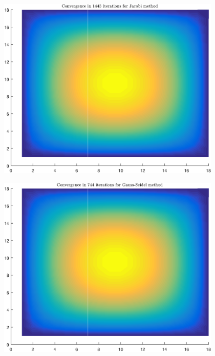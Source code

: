 \documentclass[11pt]{article}
\begin{document}
\begin{figure}
\centering
\begin{minipage}{.45\textwidth}
\centering
\includegraphics[width=\linewidth]{math609_pa2_comp_example_2_16_n_Jacobi.eps}
\label{fig:test1}
\end{minipage}\hfill
\begin{minipage}{.45\textwidth}
\centering
\includegraphics[width=\linewidth]{math609_pa2_comp_example_2_16_n_Gauss-Seidel.eps}
\label{fig:test2}
\end{minipage}\hfill

\end{figure}
\end{document}
